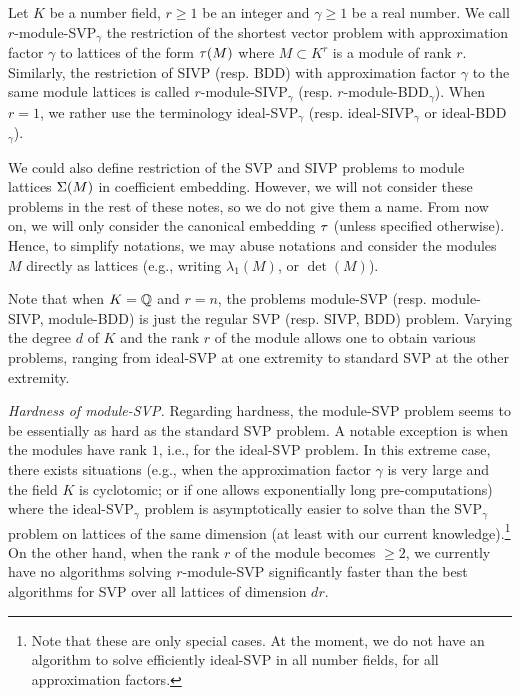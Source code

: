 \begin{definition}
Let $K$ be a number field, $r \geq 1$ be an integer and $\gamma \geq 1$ be a real number. We call $r$-module-SVP$_\gamma$ the restriction of the shortest vector problem with approximation factor $\gamma$ to lattices of the form $\tau(M)$ where $M \subset K^r$ is a module of rank $r$.
Similarly, the restriction of SIVP (resp. BDD) with approximation factor $\gamma$ to the same module lattices is called $r$-module-SIVP$_\gamma$ (resp. $r$-module-BDD$_\gamma$).
When $r = 1$, we rather use the terminology ideal-SVP$_\gamma$ (resp. ideal-SIVP$_\gamma$ or ideal-BDD$_\gamma$).
\end{definition}

We could also define restriction of the SVP and SIVP problems to module lattices $\Sigma(M)$ in coefficient embedding. However, we will not consider these problems in the rest of these notes, so we do not give them a name. From now on, we will only consider the canonical embedding $\tau$ (unless specified otherwise). Hence, to simplify notations, we may abuse notations and consider the modules $M$ directly as lattices (e.g., writing $\lambda_1(M)$, or $\det(M)$).

Note that when $K = \mathbb{Q}$ and $r = n$, the problems module-SVP (resp. module-SIVP, module-BDD) is just the regular SVP (resp. SIVP, BDD) problem. Varying the degree $d$ of $K$ and the rank $r$ of the module allows one to obtain various problems, ranging from ideal-SVP at one extremity to standard SVP at the other extremity.

\noindent\textit{Hardness of module-SVP.} Regarding hardness, the module-SVP problem seems to be essentially as hard as the standard SVP problem. A notable exception is when the modules have rank $1$, i.e., for the ideal-SVP problem. In this extreme case, there exists situations (e.g., when the approximation factor $\gamma$ is very large and the field $K$ is cyclotomic; or if one allows exponentially long pre-computations) where the ideal-SVP$_\gamma$ problem is asymptotically easier to solve than the SVP$_\gamma$ problem on lattices of the same dimension (at least with our current knowledge).\footnote{Note that these are only special cases. At the moment, we do not have an algorithm to solve efficiently ideal-SVP in all number fields, for all approximation factors.}
On the other hand, when the rank $r$ of the module becomes $\geq 2$, we currently have no algorithms solving $r$-module-SVP significantly faster than the best algorithms for SVP over all lattices of dimension $dr$.

